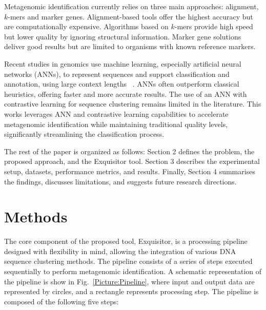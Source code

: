 \documentclass[biomedinformatics,article,submit,moreauthors]{Definitions/mdpi}
\begin{document}
    Metagenomic identification currently relies on three main approaches: alignment, $k$-mers and marker genes. Alignment-based tools offer the highest accuracy but are computationally expensive. Algorithms based on $k$-mers provide high speed but lower quality by ignoring structural information. Marker gene solutions deliver good results but are limited to organisms with known reference markers.

    Recent studies in genomics use machine learning, especially artificial neural networks (ANNs), to represent sequences and support classification and annotation, using large context lengths ~\citep{nguyen2023hyenadna, yang2026explicit}.
    ANNs often outperform classical heuristics, offering faster and more accurate results.
    The use of an ANN with contrastive learning for sequence clustering remains limited in the literature.
    This works leverages ANN  and contrastive learning capabilities to accelerate metagenomic identification while maintaining traditional quality levels, significantly streamlining the classification process.


    The rest of the paper is organized as follows: Section 2 defines the problem, the proposed approach, and the Exquisitor tool. Section 3 describes the experimental setup, datasets, performance metrics, and results. Finally, Section 4 summarises the findings, discusses limitations, and suggests future research directions.

    \section{Methods}

        The core component of the proposed tool, Exquisitor, is a processing pipeline designed with flexibility in mind, allowing the integration of various DNA sequence clustering methods. The pipeline consists of a series of steps executed sequentially to perform metagenomic identification. A schematic representation of the pipeline is show in Fig.~\ref{Picture:Pipeline}, where input and output data are represented by circles, and a rectangle represents processing step. The pipeline is composed of the following five steps:
\end{document}
